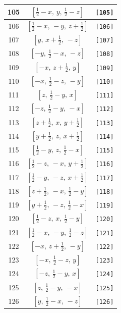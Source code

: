 \documentclass[fleqn,8pt]{jsarticle}
\begin{document}
\begin{longtable}{ccc}
105 & $\left[ \frac{1}{2} - x,\, y,\, \frac{1}{2} - z \right]$ & {\tt [105]} \\ \hline
106 & $\left[ \frac{1}{2} - x,\, - y,\, z + \frac{1}{2} \right]$ & {\tt [106]} \\ \hline
107 & $\left[ y,\, x + \frac{1}{2},\, - z \right]$ & {\tt [107]} \\ \hline
108 & $\left[ - y,\, \frac{1}{2} - x,\, - z \right]$ & {\tt [108]} \\ \hline
109 & $\left[ - x,\, z + \frac{1}{2},\, y \right]$ & {\tt [109]} \\ \hline
110 & $\left[ - x,\, \frac{1}{2} - z,\, - y \right]$ & {\tt [110]} \\ \hline
111 & $\left[ z,\, \frac{1}{2} - y,\, x \right]$ & {\tt [111]} \\ \hline
112 & $\left[ - z,\, \frac{1}{2} - y,\, - x \right]$ & {\tt [112]} \\ \hline
113 & $\left[ z + \frac{1}{2},\, x,\, y + \frac{1}{2} \right]$ & {\tt [113]} \\ \hline
114 & $\left[ y + \frac{1}{2},\, z,\, x + \frac{1}{2} \right]$ & {\tt [114]} \\ \hline
115 & $\left[ \frac{1}{2} - y,\, z,\, \frac{1}{2} - x \right]$ & {\tt [115]} \\ \hline
116 & $\left[ \frac{1}{2} - z,\, - x,\, y + \frac{1}{2} \right]$ & {\tt [116]} \\ \hline
117 & $\left[ \frac{1}{2} - y,\, - z,\, x + \frac{1}{2} \right]$ & {\tt [117]} \\ \hline
118 & $\left[ z + \frac{1}{2},\, - x,\, \frac{1}{2} - y \right]$ & {\tt [118]} \\ \hline
119 & $\left[ y + \frac{1}{2},\, - z,\, \frac{1}{2} - x \right]$ & {\tt [119]} \\ \hline
120 & $\left[ \frac{1}{2} - z,\, x,\, \frac{1}{2} - y \right]$ & {\tt [120]} \\ \hline
121 & $\left[ \frac{1}{2} - x,\, - y,\, \frac{1}{2} - z \right]$ & {\tt [121]} \\ \hline
122 & $\left[ - x,\, z + \frac{1}{2},\, - y \right]$ & {\tt [122]} \\ \hline
123 & $\left[ - x,\, \frac{1}{2} - z,\, y \right]$ & {\tt [123]} \\ \hline
124 & $\left[ - z,\, \frac{1}{2} - y,\, x \right]$ & {\tt [124]} \\ \hline
125 & $\left[ z,\, \frac{1}{2} - y,\, - x \right]$ & {\tt [125]} \\ \hline
126 & $\left[ y,\, \frac{1}{2} - x,\, - z \right]$ & {\tt [126]} \\ \hline

\end{longtable}
\end{document}
